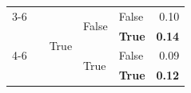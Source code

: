 \documentclass{article}
\begin{document}
\begin{table}
\begin{center}
{\begin{tabular}{@{}lllllr@{}}
    \cmidrule{3-6}
                                            &                                   & \multirow[c]{4}{*}{True}  & \multirow[c]{2}{*}{False} & False                 & 0.10 \\
                                            &                                   &                           &                           & \textbf{True}         & \textbf{0.14} \\
    \cmidrule{4-6}
                                            &                                   &                           & \multirow[c]{2}{*}{True}  & False                 & 0.09 \\
                                            &                                   &                           &                           & \textbf{True}         & \textbf{0.12} \\
   \bottomrule
\end{tabular}
}
    \end{center}
    \label{tab:past-actions-ablation-gemini-flash}
\end{table}
\end{document}
